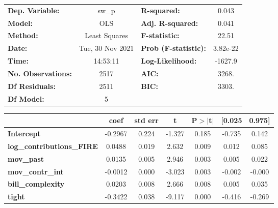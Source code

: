 \begin{center}
\begin{tabular}{lclc}
\toprule
\textbf{Dep. Variable:}           &      sw\_p       & \textbf{  R-squared:         } &     0.043   \\
\textbf{Model:}                   &       OLS        & \textbf{  Adj. R-squared:    } &     0.041   \\
\textbf{Method:}                  &  Least Squares   & \textbf{  F-statistic:       } &     22.51   \\
\textbf{Date:}                    & Tue, 30 Nov 2021 & \textbf{  Prob (F-statistic):} &  3.82e-22   \\
\textbf{Time:}                    &     14:53:11     & \textbf{  Log-Likelihood:    } &   -1627.9   \\
\textbf{No. Observations:}        &        2517      & \textbf{  AIC:               } &     3268.   \\
\textbf{Df Residuals:}            &        2511      & \textbf{  BIC:               } &     3303.   \\
\textbf{Df Model:}                &           5      & \textbf{                     } &             \\
\bottomrule
\end{tabular}
\begin{tabular}{lcccccc}
                                  & \textbf{coef} & \textbf{std err} & \textbf{t} & \textbf{P$> |$t$|$} & \textbf{[0.025} & \textbf{0.975]}  \\
\midrule
\textbf{Intercept}                &      -0.2967  &        0.224     &    -1.327  &         0.185        &       -0.735    &        0.142     \\
\textbf{log\_contributions\_FIRE} &       0.0488  &        0.019     &     2.632  &         0.009        &        0.012    &        0.085     \\
\textbf{mov\_past}                &       0.0135  &        0.005     &     2.946  &         0.003        &        0.005    &        0.022     \\
\textbf{mov\_contr\_int}          &      -0.0012  &        0.000     &    -3.023  &         0.003        &       -0.002    &       -0.000     \\
\textbf{bill\_complexity}         &       0.0203  &        0.008     &     2.666  &         0.008        &        0.005    &        0.035     \\
\textbf{tight}                    &      -0.3422  &        0.038     &    -9.117  &         0.000        &       -0.416    &       -0.269     \\

\end{tabular}
\end{center}
